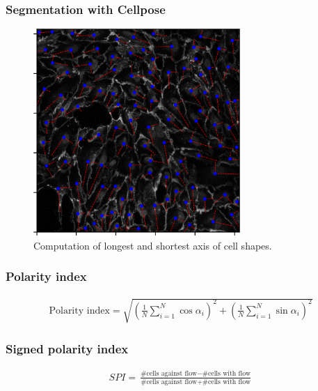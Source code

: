 \documentclass[14pt]{beamer}
\begin{document}
\begin{frame}[plain]
\frametitle{\normalsize \bf Segmentation with Cellpose}

\centering

\tiny
\begin{figure}
  \centering
  \includegraphics[width=0.7\textwidth]{images/image_001_cellshape_orientation.png}\\
  \tiny
  Computation of longest and shortest axis of cell shapes.
\end{figure}

\end{frame}





\begin{frame}
\frametitle{\normalsize \bf Polarity index}
\scriptsize
\centering

\begin{align}
    \text{Polarity index} = \sqrt{ \left(\frac{1}{N} \sum^N_{i=1} \cos \alpha_i \right)^2 + \left(\frac{1}{N} \sum^N_{i=1} \sin \alpha_i \right)^2}
\end{align}



\end{frame}


\begin{frame}
\frametitle{\normalsize \bf Signed polarity index}
\scriptsize
\centering

\begin{align}
    SPI = \frac{\text{\#cells against flow} - \text{\#cells with flow}}{\text{\#cells against flow} + \text{\#cells with flow}}
\end{align}



\end{frame}




\end{document}
